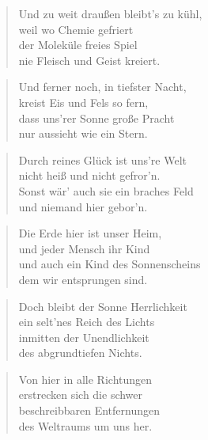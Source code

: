 \documentclass[10pt,a4paper]{article}
\begin{document}
\begin{multicols}{2}
\begin{verse}
Und zu weit draußen bleibt’s zu kühl, \\
weil wo Chemie gefriert \\
der Moleküle freies Spiel \\
nie Fleisch und Geist kreiert. \\
\end{verse}

\begin{verse}
Und ferner noch, in tiefster Nacht, \\
kreist Eis und Fels so fern, \\
dass uns’rer Sonne große Pracht \\
nur aussieht wie ein Stern. \\
\end{verse}

\begin{verse}
Durch reines Glück ist uns’re Welt \\
nicht heiß und nicht gefror’n. \\
Sonst wär’ auch sie ein braches Feld \\
und niemand hier gebor’n. \\
\end{verse}

\begin{verse}
Die Erde hier ist unser Heim, \\
und jeder Mensch ihr Kind \\
und auch ein Kind des Sonnenscheins \\
dem wir entsprungen sind. \\
\end{verse}

\begin{verse}
Doch bleibt der Sonne Herrlichkeit \\
ein selt’nes Reich des Lichts \\
inmitten der Unendlichkeit \\
des abgrundtiefen Nichts. \\
\end{verse}

\begin{verse}
Von hier in alle Richtungen \\
erstrecken sich die schwer \\
beschreibbaren Entfernungen \\
des Weltraums um uns her. \\
\end{verse}


\end{multicols}
\end{document}
